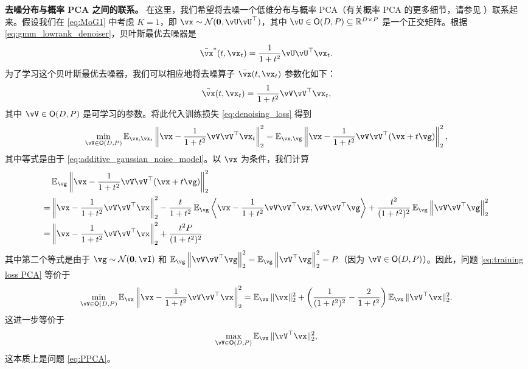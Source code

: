 \documentclass[../../book-main_zh.tex]{subfiles}
\begin{document}
\begin{remark}
{\bf 去噪分布与概率 PCA 之间的联系。} 在这里，我们希望将去噪一个低维分布与概率 PCA（有关概率 PCA 的更多细节，请参见 ）联系起来。假设我们在 \eqref{eq:MoG1} 中考虑 $K=1$，即 $\vx \sim   \dNorm(\vzero, \vU\vU^{\top})$，其中 \(\vU \in \O(D, P) \subseteq \R^{D \times P}\) 是一个正交矩阵。根据 \eqref{eq:gmm_lowrank_denoiser}，贝叶斯最优去噪器是
\begin{align}
    \bar{\vx}^{\ast}(t, \vx_{t}) = \frac{1}{1 + t^{2}} \vU\vU^\top\vx_t. 
\end{align}
为了学习这个贝叶斯最优去噪器，我们可以相应地将去噪算子 $\bar{\vx}(t,\vx_t)$ 参数化如下：
\begin{align}
    \bar{\vx}(t,\vx_t) = \frac{1}{1 + t^{2}} \vV\vV^\top\vx_t,
\end{align}
其中 $\vV \in \O(D, P)$ 是可学习的参数。将此代入训练损失 \eqref{eq:denoising_loss} 得到
\begin{equation}\label{eq:training loss PCA}
	  \min_{\vV \in \O(D, P)}\Ex_{\vx, \vx_{t}}\left\|\vx - \frac{1}{1 + t^{2}} \vV\vV^\top\vx_t\right\|_{2}^{2} = \Ex_{\vx, \vg}\left\|\vx - \frac{1}{1 + t^{2}} \vV\vV^\top(\vx + t\vg)\right\|_{2}^{2},
\end{equation}
其中等式是由于 \eqref{eq:additive_gaussian_noise_model}。以 $\vx$ 为条件，我们计算
\begin{align}
    & \Ex_{\vg}\left\|\vx - \frac{1}{1 + t^{2}} \vV\vV^\top(\vx + t\vg)\right\|_{2}^{2} \\
    = & \left\|\vx - \frac{1}{1 + t^{2}} \vV\vV^\top \vx\right\|_{2}^{2} - \frac{t}{1+t^2}\Ex_{\vg} \left\langle \vx - \frac{1}{1 + t^{2}} \vV\vV^\top \vx,  \vV\vV^\top\vg \right\rangle + \frac{t^2}{(1+t^2)^2} \Ex_{\vg}\left\| \vV\vV^\top \vg \right\|_2^2 \\
    = & \left\|\vx - \frac{1}{1 + t^{2}} \vV\vV^\top \vx\right\|_{2}^{2} + \frac{t^2P}{(1+t^2)^2} 
\end{align}
其中第二个等式是由于 \(\vg \sim \dNorm(\vzero, \vI)\) 和 $ \Ex_{\vg}\left\| \vV\vV^\top \vg \right\|_2^2 = \Ex_{\vg}\left\|\vV^\top \vg \right\|_2^2 = P$（因为 $\vV \in \O(D, P)$）。因此，问题 \eqref{eq:training loss PCA} 等价于
\begin{align}
    \min_{\vV \in \O(D, P)}\Ex_{\vx} \left\|\vx - \frac{1}{1 + t^{2}} \vV\vV^\top \vx\right\|_{2}^{2} = \Ex_{\vx} \|\vx\|_2^2 + \left( \frac{1}{(1+t^2)^2} - \frac{2}{1+t^2} \right) \Ex_{\vx}\|\vV^\top \vx\|_2^2.
\end{align}
这进一步等价于
\begin{align}
    \max_{\vV \in \O(D, P)} \Ex_{\vx}\|\vV^\top \vx\|_2^2,
\end{align}
这本质上是问题 \eqref{eq:PPCA}。
\end{remark}
\end{document}
